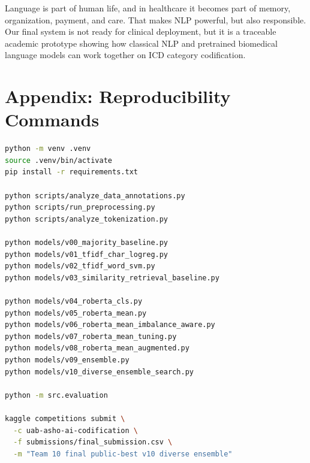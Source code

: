 \documentclass[10pt,a4paper,twocolumn]{article}
\begin{document}
Language is part of human life, and in healthcare it becomes part of memory, organization, payment, and care. That makes NLP powerful, but also responsible. Our final system is not ready for clinical deployment, but it is a traceable academic prototype showing how classical NLP and pretrained biomedical language models can work together on ICD category codification.

\section*{Appendix: Reproducibility Commands}

\begin{lstlisting}[language=bash]
python -m venv .venv
source .venv/bin/activate
pip install -r requirements.txt

python scripts/analyze_data_annotations.py
python scripts/run_preprocessing.py
python scripts/analyze_tokenization.py

python models/v00_majority_baseline.py
python models/v01_tfidf_char_logreg.py
python models/v02_tfidf_word_svm.py
python models/v03_similarity_retrieval_baseline.py

python models/v04_roberta_cls.py
python models/v05_roberta_mean.py
python models/v06_roberta_mean_imbalance_aware.py
python models/v07_roberta_mean_tuning.py
python models/v08_roberta_mean_augmented.py
python models/v09_ensemble.py
python models/v10_diverse_ensemble_search.py

python -m src.evaluation

kaggle competitions submit \
  -c uab-asho-ai-codification \
  -f submissions/final_submission.csv \
  -m "Team 10 final public-best v10 diverse ensemble"
\end{lstlisting}



\end{document}
